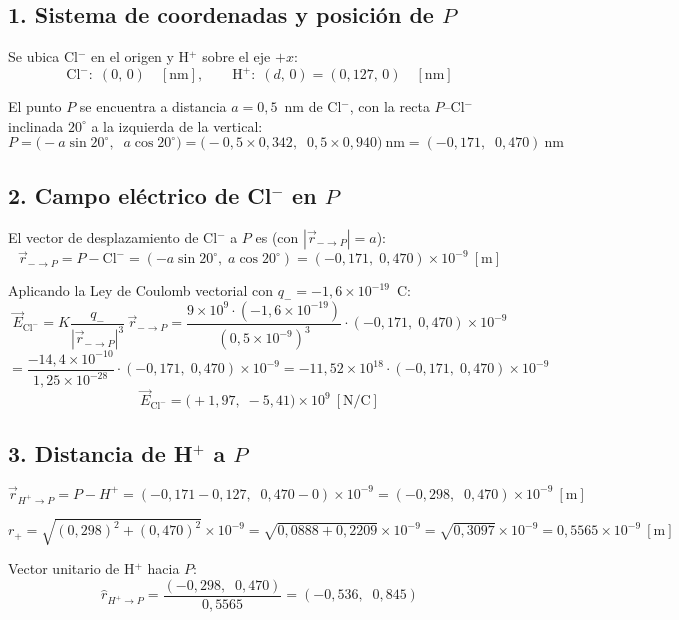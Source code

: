 \documentclass[12pt,letterpaper]{article}
\begin{document}
\subsection*{1.\; Sistema de coordenadas y posici\'on de $P$}

Se ubica Cl$^-$ en el origen y H$^+$ sobre el eje $+x$:
\[
\text{Cl}^-:\;(0,\,0)\quad[\text{nm}],\qquad
\text{H}^+:\;(d,\,0) = (0{,}127,\,0)\quad[\text{nm}]
\]

El punto $P$ se encuentra a distancia $a = 0{,}5$~nm de Cl$^-$, con la recta
$P$--Cl$^-$ inclinada $20^\circ$ a la izquierda de la vertical:
\[
P = \bigl(-a\sin20^\circ,\;\;a\cos20^\circ\bigr)
= \bigl(-0{,}5\times0{,}342,\;\;0{,}5\times0{,}940\bigr)\ \text{nm}
= (-0{,}171,\;\;0{,}470)\ \text{nm}
\]

\subsection*{2.\; Campo el\'ectrico de Cl$^-$ en $P$}

El vector de desplazamiento de Cl$^-$ a $P$ es (con $|\vec{r}_{-\to P}| = a$):
\[
\vec{r}_{-\to P} = P - \text{Cl}^-
= (-a\sin20^\circ,\;a\cos20^\circ)
= (-0{,}171,\;0{,}470)\times10^{-9}\ [\text{m}]
\]

Aplicando la Ley de Coulomb vectorial con $q_- = -1{,}6\times10^{-19}$~C:
\[
\vec{E}_{\text{Cl}^-}
= K\frac{q_-}{|\vec{r}_{-\to P}|^3}\,\vec{r}_{-\to P}
= \frac{9\times10^{9}\cdot(-1{,}6\times10^{-19})}{(0{,}5\times10^{-9})^3}
  \cdot(-0{,}171,\;0{,}470)\times10^{-9}
\]
\[
= \frac{-14{,}4\times10^{-10}}{1{,}25\times10^{-28}}
  \cdot(-0{,}171,\;0{,}470)\times10^{-9}
= -11{,}52\times10^{18}\cdot(-0{,}171,\;0{,}470)\times10^{-9}
\]
\[
\vec{E}_{\text{Cl}^-}
= \bigl(+1{,}97,\;-5{,}41\bigr)\times10^{9}\ [\text{N/C}]
\]

\subsection*{3.\; Distancia de H$^+$ a $P$}

\[
\vec{r}_{H^+\to P}
= P - H^+
= (-0{,}171 - 0{,}127,\;\;0{,}470 - 0)\times10^{-9}
= (-0{,}298,\;\;0{,}470)\times10^{-9}\ [\text{m}]
\]

\[
r_+
= \sqrt{(0{,}298)^2 + (0{,}470)^2}\times10^{-9}
= \sqrt{0{,}0888 + 0{,}2209}\times10^{-9}
= \sqrt{0{,}3097}\times10^{-9}
= 0{,}5565\times10^{-9}\ [\text{m}]
\]

Vector unitario de H$^+$ hacia $P$:
\[
\hat{r}_{H^+\to P}
= \frac{(-0{,}298,\;\;0{,}470)}{0{,}5565}
= (-0{,}536,\;\;0{,}845)
\]
\end{document}
